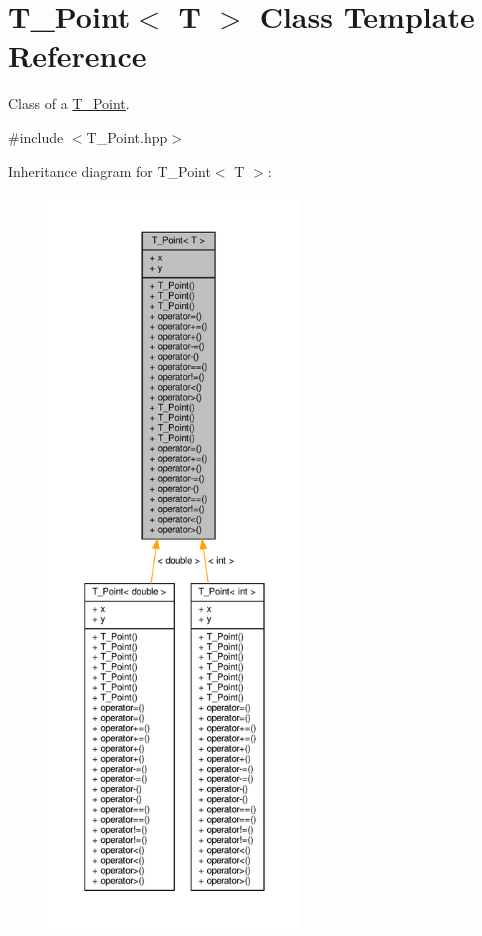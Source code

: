 \hypertarget{classT__Point}{}\section{T\+\_\+\+Point$<$ T $>$ Class Template Reference}
\label{classT__Point}


Class of a \hyperlink{classT__Point}{T\+\_\+\+Point}.  




{\ttfamily \#include $<$T\+\_\+\+Point.\+hpp$>$}



Inheritance diagram for T\+\_\+\+Point$<$ T $>$\+:\nopagebreak
\begin{figure}[H]
\begin{center}
\leavevmode
\includegraphics[height=550pt]{classT__Point__inherit__graph}
\end{center}
\end{figure}


